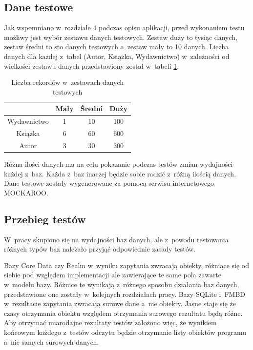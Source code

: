 \subsection{Dane testowe}

Jak wspomniano w~rozdziale  4 podczas opisu aplikacji, przed wykonaniem testu możliwy jest wybór zestawu danych testowych. Zestaw duży to tysiąc danych, zestaw średni to sto danych testowych a~zestaw mały to 10 danych. Liczba danych dla każdej z~tabel (Autor, Książka, Wydawnictwo) w~zależności od wielkości zestawu danych przedstawiony został w~tabeli \ref{tab: zestaw_danych}.

\begin{table}[h]
\centering
\caption {Liczba rekordów w~zestawach danych testowych}
\label{tab: zestaw_danych}
\begin{tabular}{|c|c|c|c|}
\hline
\multicolumn{1}{|l|}{} & Mały & Średni & Duży \\ \hline
Wydawnictwo            & 1    & 10     & 100  \\ \hline
Książka                & 6    & 60     & 600  \\ \hline
Autor                  & 3    & 30     & 300  \\ \hline
\end{tabular}
\end{table}

Różna ilości danych ma na celu pokazanie podczas testów zmian wydajności każdej z~baz. Każda z~baz inaczej będzie sobie radzić z~różną ilością danych. Dane testowe zostały wygenerowane za pomocą serwisu internetowego MOCKAROO. 

\subsection{Przebieg testów}

 W~pracy skupiono się na wydajności baz danych, ale z~powodu testowania różnych typów baz należało przyjąć odpowiednie zasady testów.\par 
Bazy Core Data czy Realm w~wyniku zapytania zwracają obiekty, różniące się od siebie pod względem implementacji ale zawierające te same pola zawarte w~modelu bazy. Różnice te wynikają z~różnego sposobu działania baz danych, przedstawione one zostały w~kolejnych rozdziałach pracy. Bazy SQLite i~FMBD w~rezultacie zapytania zwracają surowe dane a~nie obiekty. Jasne staje się że czasy otrzymania obiektu względem otrzymania surowego rezultatu będą różne. Aby otrzymać miarodajne rezultaty testów założono więc, że wynikiem końcowym każdego z~testów odczytu będzie otrzymanie listy obiektów programu a~nie samych surowych danych. 


